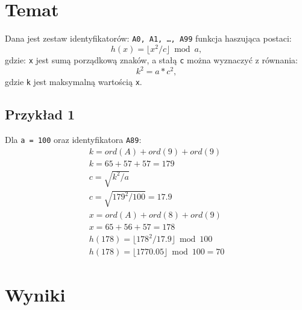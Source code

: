 \documentclass{article}
\begin{document}
\section{Temat} \label{p1}
Dana jest zestaw identyfikatorów: \texttt{A0, A1, \ldots, A99} funkcja haszująca postaci: 
\begin{equation}
h(x) = \lfloor x^2 / c \rfloor \bmod a,
\end{equation}gdzie: \texttt{x} jest sumą porządkową znaków, a stałą \texttt{c} można wyznaczyć z równania: 
\begin{equation}
	k^2 = a * c ^2,
\end{equation}gdzie \texttt{k} jest maksymalną wartością \texttt{x}.

	\subsection{Przykład 1}
	Dla \texttt{a = 100} oraz identyfikatora \texttt{A89}:
	\begin{equation}
	\begin{aligned}
	k = ord(A) + ord(9) + ord(9) \\
	k = 65 + 57 + 57 = 179 \\
	c = \sqrt{k^2 / a} \\
	c = \sqrt{179^2 / 100} = 17.9 \\
	x = ord(A) + ord(8) + ord(9) \\
	x = 65 + 56 + 57 = 178 \\	
	h(178) = \lfloor 178^2 / 17.9 \rfloor \bmod 100 \\
	h(178) = \lfloor 1770.05 \rfloor \bmod 100 = 70
	\end{aligned}	
	\end{equation} 

\clearpage
\section{Wyniki}
\end{document}
